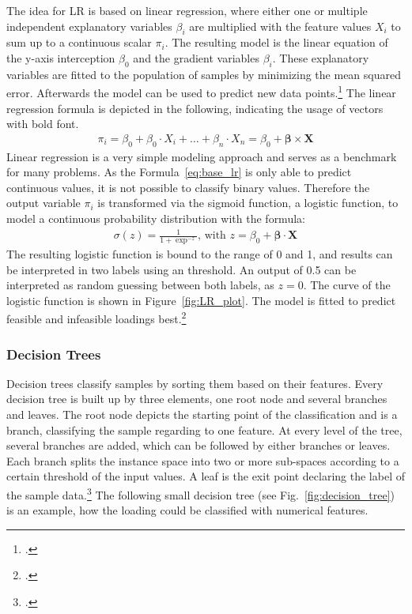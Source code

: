 The idea for \gls{LR} is based on linear regression, where either one or multiple independent explanatory
variables $\beta_i$ are multiplied with the feature values $X_i$ to sum up to a continuous scalar $\pi_i$.
The resulting model is the linear equation of the y-axis interception $\beta_0$
and the gradient variables $\beta_i$.
These explanatory variables are fitted to the population of samples by minimizing the mean squared
error. Afterwards the model can be used to predict new data points.\footcite[cf.][p. 6f]{nasteski_overview_2017}
The linear regression formula is depicted in the following, indicating the usage of vectors with bold font.
\begin{align}
    \pi_i=\beta_0+\beta_0 \cdot X_i+\dots+\beta_n \cdot X_n = \beta_0 + \bm{\beta} \times \bm{X}
    \label{eq:base_lr}
\end{align}
Linear regression is a very simple modeling approach and serves as a benchmark for many problems. As the Formula~\ref{eq:base_lr} is only able to predict continuous
values, it is not possible to classify binary values. Therefore the output variable $\pi_i$ is transformed via the sigmoid function, a logistic function,
to model a continuous probability distribution with the formula:
\begin{align}
    \sigma(z)=\frac{1}{1+\exp^{-z}},\, \text{with } z = \beta_0 + \bm{\beta} \cdot \bm{X}
    \label{eq:logistic_func}
\end{align}
The resulting logistic function is bound to the range of 0 and 1, and results can be interpreted
in two labels using an threshold. An output of 0.5 can be interpreted as random
guessing between both labels, as $z=0$. The curve of the logistic function is shown in Figure~\ref{fig:LR_plot}.
The model is fitted to predict feasible and infeasible loadings best.\footcite[cf.][]{kirasich_random_2018}



\subsubsection{Decision Trees}
Decision trees classify samples by sorting them based on their features. Every decision tree
is built up by three elements, one root node and several branches and leaves. The root node
depicts the starting point of the classification and is a branch, classifying the sample
regarding to one feature. At every level of the tree, several branches are added, which can be followed
by either branches or leaves. Each branch splits the instance space into two or more sub-spaces
according to a certain threshold of the input values. A leaf is the exit point declaring
the label of the sample data.\footcite[cf.][p. 5f]{nasteski_overview_2017}
The following small decision tree (see Fig.~\ref{fig:decision_tree}) is an example,
how the loading could be classified with numerical features.

